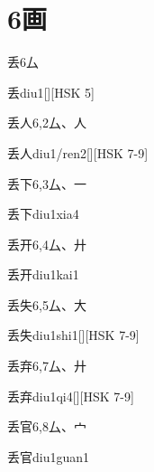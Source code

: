 
\section*{6画}

\begin{Entry}{丢}{6}{⼛}
  \begin{Phonetics}{丢}{diu1}[][HSK 5]
  \end{Phonetics}
\end{Entry}

\begin{Entry}{丢人}{6,2}{⼛、⼈}
  \begin{Phonetics}{丢人}{diu1/ren2}[][HSK 7-9]
  \end{Phonetics}
\end{Entry}

\begin{Entry}{丢下}{6,3}{⼛、⼀}
  \begin{Phonetics}{丢下}{diu1xia4}
  \end{Phonetics}
\end{Entry}

\begin{Entry}{丢开}{6,4}{⼛、⼶}
  \begin{Phonetics}{丢开}{diu1kai1}
  \end{Phonetics}
\end{Entry}

\begin{Entry}{丢失}{6,5}{⼛、⼤}
  \begin{Phonetics}{丢失}{diu1shi1}[][HSK 7-9]
  \end{Phonetics}
\end{Entry}

\begin{Entry}{丢弃}{6,7}{⼛、⼶}
  \begin{Phonetics}{丢弃}{diu1qi4}[][HSK 7-9]
  \end{Phonetics}
\end{Entry}

\begin{Entry}{丢官}{6,8}{⼛、⼧}
  \begin{Phonetics}{丢官}{diu1guan1}
  \end{Phonetics}
\end{Entry}

